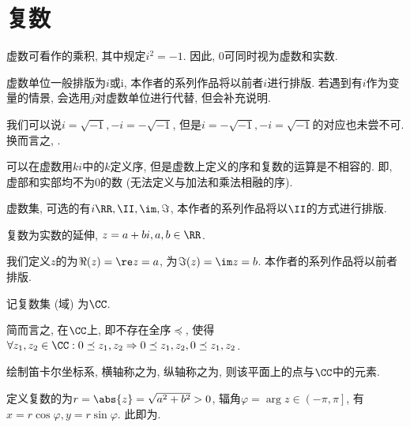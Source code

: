\documentclass[8pt]{article}
\author{\Author}
\title{\Title}
\date{}
\begin{document}
	\maketitle

	\tableofcontents

	\section{复数}
		 虚数可看作的乘积, 其中规定\(i^2 = -1\). 因此, \(0\)可同时视为虚数和实数.

		 虚数单位一般排版为\(i\)或\(\mathrm{i}\), 本作者的系列作品将以前者\(i\)进行排版. 若遇到有\(i\)作为变量的情景, 会选用\(j\)对虚数单位进行代替, 但会补充说明.
		
		 我们可以说\(i = \sqrt{-1}, -i = -\sqrt{-1}\), 但是\(i = -\sqrt{-1}, -i = \sqrt{-1}\)的对应也未尝不可. 换而言之, . \cite{wiki-img}

		 可以在虚数用\(ki\)中的\(k\)定义序, 但是虚数上定义的序和复数的运算是不相容的. 即, 虚部和实部均不为\(0\)的数 (无法定义与加法和乘法相融的序). \cite{wiki-img}

		 虚数集, 可选的有\(i\RR, \II, \im, \Im\), 本作者的系列作品将以\(\II\)的方式进行排版.

		 复数为实数的延伸,  \(z = a + bi, a, b \in \RR\).
		
		 我们定义\(z\)的为\(\Re (z) = \re z = a\), 为\(\Im (z) = \im z = b\). 本作者的系列作品将以前者排版.
		
		 记复数集 (域) 为\(\CC\).

		 简而言之, 在\(\CC\)上, 即不存在全序\(\preceq\), 使得\(\forall z_1, z_2 \in \CC: 0 \preceq z_1, z_2 \Rightarrow 0 \preceq z_1, z_2, 0 \preceq z_1, z_2\). \cite{wiki-comp}

		 绘制笛卡尔坐标系, 横轴称之为, 纵轴称之为, 则该平面上的点与\(\CC\)中的元素.

		 定义复数的为\(r = \abs{z} = \sqrt{a^2 + b^2} > 0\), 辐角\(\varphi = \arg z \in \left(-\pi, \pi\right]\), 有\(x = r \cos \varphi, y = r \sin \varphi\). 此即为.
\end{document}
